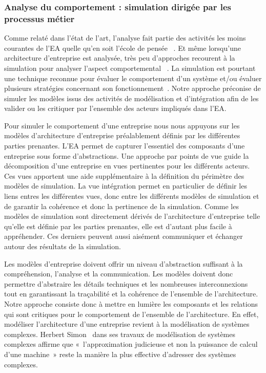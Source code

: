        \subsubsection{Analyse du comportement : simulation dirigée par les processus
métier}

Comme relaté dans l'état de l'art, l'analyse fait partie des activités les moins
courantes de l'EA quelle qu'en soit l'école de pensée
\cite{chen2008architectures}~\cite{barn2013enterprise}. Et même lorsqu'une
architecture d'entreprise est analysée, très peu d'approches recourent à la
simulation pour analyser l'aspect comportemental~\cite{glazner2011enterprise}
\cite{manzur2015xarchimate}. La simulation est pourtant une technique reconnue
pour évaluer le comportement d'un système et/ou évaluer plusieurs stratégies
concernant son fonctionnement~\cite{shannon1975systems}. Notre approche
préconise de simuler les modèles issus des activités de modélisation et
d'intégration afin de les valider ou les critiquer par l'ensemble des acteurs
impliqués dans l'EA.

Pour simuler le comportement d'une entreprise nous nous appuyons sur les modèles
d'architecture d'entreprise préalablement définis par les différentes parties
prenantes. L'EA permet de capturer l'essentiel des composants d'une
entreprise sous forme d'abstractions. Une approche par points de vue guide la
décomposition d'une entreprise en vues pertinentes pour les différents acteurs.
Ces vues apportent une aide supplémentaire à la définition du périmètre des
modèles de simulation. La vue intégration permet en particulier de définir les
liens entres les différentes vues, donc entre les différents modèles de
simulation et de garantir la cohérence et donc la pertinence de la simulation.
Comme les modèles de simulation sont directement dérivés de l'architecture
d'entreprise telle qu'elle est définie par les parties prenantes, elle est
d'autant plus facile à appréhender. Ces derniers peuvent aussi
aisément communiquer et échanger autour des résultats de la simulation.

Les modèles d'entreprise doivent offrir un niveau d'abstraction suffisant à la
compréhension, l'analyse et la communication. Les modèles doivent donc permettre
d'abstraire les détails techniques et les nombreuses interconnexions tout en
garantissant la traçabilité et la cohérence de l'ensemble de l'architecture.
Notre approche consiste donc à mettre en lumière les composants et les
relations qui sont critiques pour le comportement de l'ensemble de
l'architecture. En effet, modéliser l'architecture d'une entreprise revient à la
modélisation de systèmes complexes. Herbert Simon~\cite{simon1990prediction}
dans ses travaux de modélisation de systèmes complexes affirme que
«~l'approximation judicieuse et non la puissance de calcul d'une machine~» reste
la manière la plus effective d'adresser des systèmes complexes.

